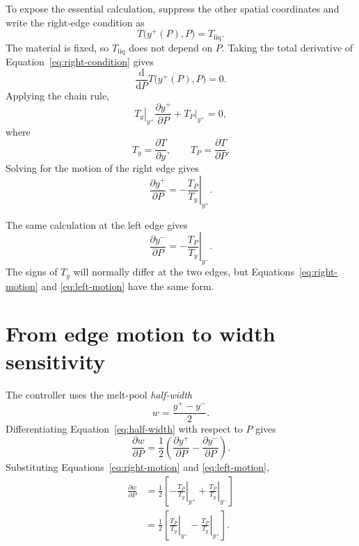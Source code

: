 \documentclass[11pt]{article}
\newcommand{\Tliq}{T_{\mathrm{liq}}}
\newcommand{\evalat}[2]{\left.#1\right|_{#2}}
\begin{document}
To expose the essential calculation, suppress the other spatial coordinates
and write the right-edge condition as
\begin{equation}
  T\bigl(y^+(P),P\bigr)=\Tliq.
  \label{eq:right-condition}
\end{equation}
The material is fixed, so $\Tliq$ does not depend on $P$.  Taking the total
derivative of Equation~\eqref{eq:right-condition} gives
\begin{equation}
  \frac{\mathrm{d}}{\mathrm{d}P}
  T\bigl(y^+(P),P\bigr)=0.
\end{equation}
Applying the chain rule,
\begin{equation}
  \evalat{T_y}{y^+}\frac{\partial y^+}{\partial P}
  +\evalat{T_P}{y^+}=0,
\end{equation}
where
\begin{equation}
  T_y=\frac{\partial T}{\partial y},
  \qquad
  T_P=\frac{\partial T}{\partial P}.
\end{equation}
Solving for the motion of the right edge gives
\begin{equation}
  \boxed{
  \frac{\partial y^+}{\partial P}
  =-\evalat{\frac{T_P}{T_y}}{y^+}.}
  \label{eq:right-motion}
\end{equation}

The same calculation at the left edge gives
\begin{equation}
  \boxed{
  \frac{\partial y^-}{\partial P}
  =-\evalat{\frac{T_P}{T_y}}{y^-}.}
  \label{eq:left-motion}
\end{equation}
The signs of $T_y$ will normally differ at the two edges, but
Equations~\eqref{eq:right-motion} and \eqref{eq:left-motion} have the same form.

\section{From edge motion to width sensitivity}

The controller uses the melt-pool \emph{half-width}
\begin{equation}
  w=\frac{y^+-y^-}{2}.
  \label{eq:half-width}
\end{equation}
Differentiating Equation~\eqref{eq:half-width} with respect to $P$ gives
\begin{equation}
  \frac{\partial w}{\partial P}
  =\frac{1}{2}
  \left(
    \frac{\partial y^+}{\partial P}
    -\frac{\partial y^-}{\partial P}
  \right).
\end{equation}
Substituting Equations~\eqref{eq:right-motion} and \eqref{eq:left-motion},
\begin{align}
  \frac{\partial w}{\partial P}
  &=\frac{1}{2}
  \left[
    -\evalat{\frac{T_P}{T_y}}{y^+}
    +\evalat{\frac{T_P}{T_y}}{y^-}
  \right] \\
  &=\boxed{
  \frac{1}{2}
  \left[
    \evalat{\frac{T_P}{T_y}}{y^-}
    -\evalat{\frac{T_P}{T_y}}{y^+}
  \right].}
  \label{eq:width-power}
\end{align}
\end{document}
